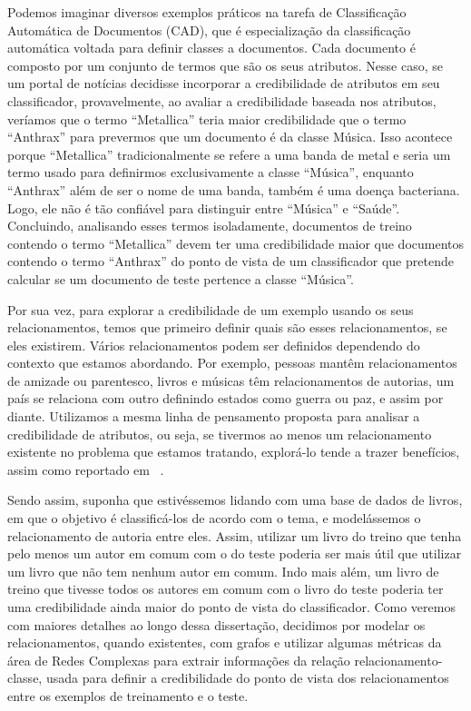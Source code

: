 Podemos imaginar diversos exemplos práticos na tarefa de Classificação Automática de Documentos (\textsc{CAD}), que é especialização da classificação automática voltada para definir classes a documentos. Cada documento é composto por um conjunto de termos que são os seus atributos. Nesse caso, se um portal de notícias decidisse incorporar a credibilidade de atributos em seu classificador, provavelmente, ao avaliar a credibilidade baseada nos atributos, veríamos que o termo ``Metallica'' teria maior credibilidade que o termo ``Anthrax'' para prevermos que um documento é da classe Música. Isso acontece porque ``Metallica'' tradicionalmente se refere a uma banda de metal e seria um termo usado para definirmos exclusivamente a classe ``Música'', enquanto ``Anthrax'' além de ser o nome de uma banda, também é uma doença bacteriana. Logo, ele não é tão confiável para distinguir entre ``Música'' e ``Saúde''.
Concluindo, analisando esses termos isoladamente, documentos de treino contendo o termo ``Metallica'' devem ter uma credibilidade maior que documentos contendo o termo ``Anthrax'' do ponto de vista de um classificador que pretende calcular se um documento de teste pertence a classe ``Música''.

Por sua vez, para explorar a credibilidade de um exemplo usando os seus relacionamentos, temos que primeiro definir quais são esses relacionamentos, se eles existirem. 
Vários relacionamentos podem ser definidos dependendo do contexto que estamos abordando. Por exemplo, pessoas mantêm relacionamentos de amizade ou parentesco, livros e músicas têm relacionamentos de autorias, um país se relaciona com outro definindo estados como guerra ou paz, e assim por diante. Utilizamos a mesma linha de pensamento proposta para analisar a credibilidade de atributos, ou seja, se tivermos ao menos um relacionamento existente no problema que estamos tratando, explorá-lo tende a trazer benefícios, assim como reportado em ~\cite{Macskassy04}.

Sendo assim, suponha que estivéssemos lidando com uma base de dados de livros, em que o objetivo é classificá-los de acordo com o tema, e modelássemos o relacionamento de autoria entre eles. Assim, utilizar um livro do treino que tenha pelo menos um autor em comum com o do teste poderia ser mais útil que utilizar um livro que não tem nenhum autor em comum. Indo mais além, um livro de treino que tivesse todos os autores em comum com o livro do teste poderia ter uma credibilidade ainda maior do ponto de vista do classificador. Como veremos com maiores detalhes ao longo dessa dissertação, decidimos por modelar os relacionamentos, quando existentes, com grafos e utilizar algumas métricas da área de Redes Complexas para extrair informações da relação relacionamento-classe, usada para definir a credibilidade do ponto de vista dos relacionamentos entre os exemplos de treinamento e o teste. 


